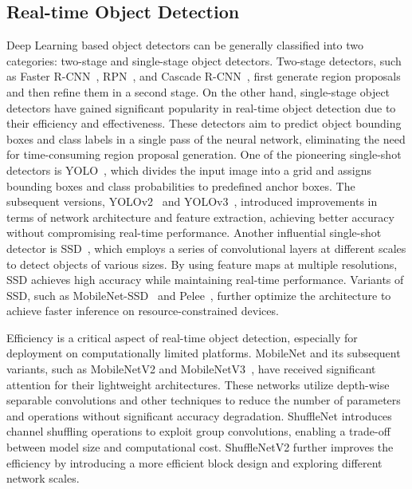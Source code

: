 \documentclass[runningheads]{llncs}
\begin{document}
%
\subsection{Real-time Object Detection}
Deep Learning based object detectors can be generally classified into two categories: two-stage and single-stage object detectors. Two-stage detectors, such as Faster R-CNN~\cite{ren2015faster}, RPN~\cite{lin2017feature}, and Cascade R-CNN~\cite{cai2018cascade}, first generate region proposals and then refine them in a second stage. On the other hand, single-stage object detectors have gained significant popularity in real-time object detection due to their efficiency and effectiveness. These detectors aim to predict object bounding boxes and class labels in a single pass of the neural network, eliminating the need for time-consuming region proposal generation. One of the pioneering single-shot detectors is YOLO~\cite{redmon2016you}, which divides the input image into a grid and assigns bounding boxes and class probabilities to predefined anchor boxes. The subsequent versions, YOLOv2~\cite{redmon2017yolo9000} and YOLOv3~\cite{redmon2018yolov3}, introduced improvements in terms of network architecture and feature extraction, achieving better accuracy without compromising real-time performance. Another influential single-shot detector is SSD~\cite{liu2016ssd}, which employs a series of convolutional layers at different scales to detect objects of various sizes. By using feature maps at multiple resolutions, SSD achieves high accuracy while maintaining real-time performance. Variants of SSD, such as MobileNet-SSD~\cite{howard2017mobilenets} and Pelee~\cite{wang2018pelee}, further optimize the architecture to achieve faster inference on resource-constrained devices.

%
Efficiency is a critical aspect of real-time object detection, especially for deployment on computationally limited platforms. MobileNet\cite{howard2017mobilenets} and its subsequent variants, such as MobileNetV2\cite{sandler2018mobilenetv2} and MobileNetV3~\cite{koonce2021mobilenetv3}, have received significant attention for their lightweight architectures. These networks utilize depth-wise separable convolutions and other techniques to reduce the number of parameters and operations without significant accuracy degradation. ShuffleNet\cite{zhang2018shufflenet} introduces channel shuffling operations to exploit group convolutions, enabling a trade-off between model size and computational cost. ShuffleNetV2\cite{ma2018shufflenet} further improves the efficiency by introducing a more efficient block design and exploring different network scales.
\end{document}
